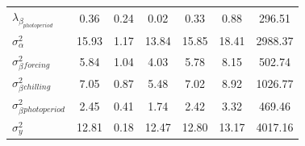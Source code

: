 \documentclass{article}\usepackage[]{graphicx}\usepackage[]{color}
\begin{document}
\begin{table}[H]
\begin{center}
\begin{tabular}{@{}lcccccc@{}}
$\lambda_\beta_{photoperiod}$  & 0.36                              & 0.24                            & 0.02                                & 0.33                              & 0.88                                 & 296.51                              \\
$\sigma_\alpha^2$              & 15.93                             & 1.17                            & 13.84                               & 15.85                             & 18.41                                & 2988.37                             \\
$\sigma_\beta^2_{forcing}$     & 5.84                              & 1.04                            & 4.03                                & 5.78                              & 8.15                                 & 502.74                              \\
$\sigma_\beta^2_{chilling}$    & 7.05                              & 0.87                            & 5.48                                & 7.02                              & 8.92                                 & 1026.77                             \\
$\sigma_\beta^2_{photoperiod}$ & 2.45                              & 0.41                            & 1.74                                & 2.42                              & 3.32                                 & 469.46                              \\
$\sigma_y^2$                   & 12.81                             & 0.18                            & 12.47                               & 12.80                             & 13.17                                & 4017.16                             \\ \bottomrule
\end{tabular}
\end{center}
\label{tab:modelanglamb}
\end{table}
\end{document}
